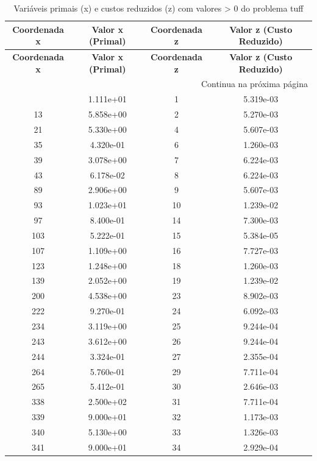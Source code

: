 \documentclass[12pt]{article}
\begin{document}
\begin{longtable}{@{}cccc@{}}
\caption{Variáveis primais (x) e custos reduzidos (z) com valores > 0 do problema tuff} \\
\toprule
\textbf{Coordenada x} & \textbf{Valor x (Primal)} & \textbf{Coordenada z} & \textbf{Valor z (Custo Reduzido)} \\
\midrule
\endfirsthead

\toprule
\textbf{Coordenada x} & \textbf{Valor x (Primal)} & \textbf{Coordenada z} & \textbf{Valor z (Custo Reduzido)} \\
\midrule
\endhead

\midrule \multicolumn{4}{r}{{Continua na próxima página}} \\ \midrule
\endfoot

\bottomrule
\endlastfoot
11 & 1.111e+01 & 1 & 5.319e-03 \\
13 & 5.858e+00 & 2 & 5.270e-03 \\
21 & 5.330e+00 & 4 & 5.607e-03 \\
35 & 4.320e-01 & 6 & 1.260e-03 \\
39 & 3.078e+00 & 7 & 6.224e-03 \\
43 & 6.178e-02 & 8 & 6.224e-03 \\
89 & 2.906e+00 & 9 & 5.607e-03 \\
93 & 1.023e+01 & 10 & 1.239e-02 \\
97 & 8.400e-01 & 14 & 7.300e-03 \\
103 & 5.222e-01 & 15 & 5.384e-05 \\
107 & 1.109e+00 & 16 & 7.727e-03 \\
123 & 1.248e+00 & 18 & 1.260e-03 \\
139 & 2.052e+00 & 19 & 1.239e-02 \\
200 & 4.538e+00 & 23 & 8.902e-03 \\
222 & 9.270e-01 & 24 & 6.092e-03 \\
234 & 3.119e+00 & 25 & 9.244e-04 \\
243 & 3.612e+00 & 26 & 9.244e-04 \\
244 & 3.324e-01 & 27 & 2.355e-04 \\
264 & 5.760e-01 & 29 & 7.711e-04 \\
265 & 5.412e-01 & 30 & 2.646e-03 \\
338 & 2.500e+02 & 31 & 7.711e-04 \\
339 & 9.000e+01 & 32 & 1.173e-03 \\
340 & 5.130e+00 & 33 & 1.326e-03 \\
341 & 9.000e+01 & 34 & 2.929e-04 \\

\end{longtable}
\end{document}
